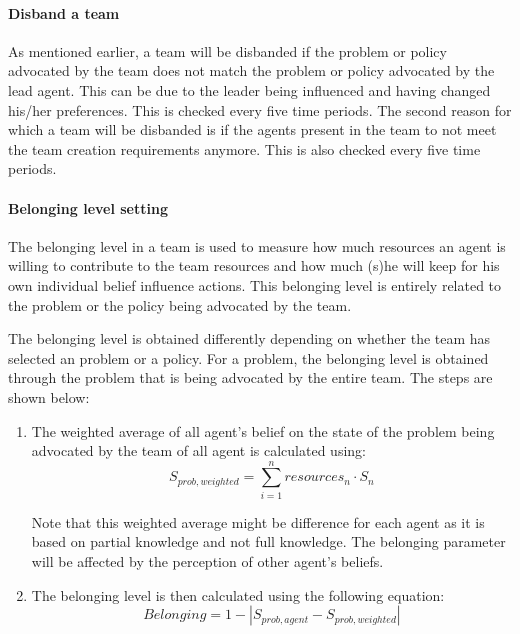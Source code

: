 \paragraph{Disband a team}

As mentioned earlier, a team will be disbanded if the problem or policy advocated by the team does not match the problem or policy advocated by the lead agent. This can be due to the leader being influenced and having changed his/her preferences. This is checked every five time periods. The second reason for which a team will be disbanded is if the agents present in the team to not meet the team creation requirements anymore. This is also checked every five time periods.


\paragraph{Belonging level setting}

The belonging level in a team is used to measure how much resources an agent is willing to contribute to the team resources and how much (s)he will keep for his own individual belief influence actions. This belonging level is entirely related to the problem or the policy being advocated by the team.

The belonging level is obtained differently depending on whether the team has selected an problem or a policy. For a problem, the belonging level is obtained through the problem that is being advocated by the entire team. The steps are shown below:

\begin{enumerate}
\item The weighted average of all agent’s belief on the state of the problem being advocated by the team of all agent is calculated using:
	\begin{equation}
	S_{prob, weighted} = \sum_{i=1}^n resources_n \cdot S_n
	\end{equation}

	Note that this weighted average might be difference for each agent as it is based on partial knowledge and not full knowledge. The belonging parameter will be affected by the perception of other agent's beliefs.

\item The belonging level is then calculated using the following equation:
	\begin{equation}
	Belonging = 1 - \left| S_{prob,agent} - S_{prob,weighted} \right|
	\end{equation}
\end{enumerate}

